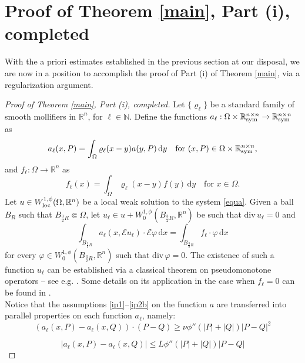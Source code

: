 \documentclass[leqno,11pt]{amsart}%
\numberwithin{equation}{section}
\newcommand{\dive}{\mathrm{div}\,}
\def\real{\mathbb R}
\def\R{\mathbb R}
\def\Rn{{\mathbb R}^{n}}
\def\rn{\Rn}
\def\d{\mathrm{d}}
\def\E{\mathcal{E}}
\def\dx{\d x}
\theoremstyle{definition}
\numberwithin{equation}{section}
\begin{document}
  \section{Proof of Theorem \ref{main}, Part (i), completed}\label{sec:proof2}
With the a priori estimates established in the previous section at our disposal, we are now in a position to accomplish the proof of Part (i) of Theorem \ref{main}, via a regularization argument.


\begin{proof}[Proof of Theorem \ref{main}, Part (i), completed]
Let $\{\varrho_\ell\}$ be a standard family of smooth mollifiers in $\rn$, for $\ell\in \mathbb N$. Define the  functions $a_\ell : \Omega\times \mathbb R^{n\times n}_{\rm sym} \to \mathbb R^{n\times n}_{\rm sym}$ as 
$${a}_\ell(x,P)=\int_{\Omega}\varrho_\ell(x-y)a(y,P)\,\d y \quad \text{for $(x,P)\in \Omega\times \mathbb R^{n\times n}_{\rm sym}$,}$$
and $f_\ell : \Omega \to \rn$ as
$${f}_\ell(x)=\int_{\Omega}\varrho_\ell(x-y)f(y)\,\d y \quad \text{for $x\in \Omega$.}$$
Let $u \in W^{1,\phi}_{\rm loc}(\Omega, \real^n)$ be a local weak solution to the system \eqref{equa}. Given a ball $B_R$ such that $B_{\frac 32R} \Subset \Omega$,  let $u_\ell \in u+ W^{1,\phi}_0(B_{\frac32 R}, \real^n)$ be such that $\dive u_\ell =0$ and
  \begin{equation}
    \label{equa-div-free-eps}
    \int_{B_{\frac{3}{2}R}}  a_\ell(x,\E u_\ell) \cdot \E\varphi \,\dx
    =
    \int_{B_{\frac{3}{2}R}} f_\ell\cdot\varphi\,\dx
  \end{equation}
  for every $\varphi\in W^{1,\phi}_0(B_{\frac{3}{2}R},\R^n)$ such that $\dive\varphi=0$.   The existence  of such a function $u_\ell$ can be established via a classical theorem  on pseudomonotone operators -- see e.g. \cite[Theorem 27.A]{zeidler}. Some details on its application in the case when $f_\ell=0$ can be found in \cite{DiKa}. 
	\\   Notice that the assumptions \eqref{ip1}--\eqref{ip2b} on the function $a$ are transferred into parallel properties on each function $a_\ell$, namely:
	   \begin{equation}\label{B1}
	( a_\ell(x,P)-a_\ell(x,Q))\cdot (P-Q) \ge \nu\phi''(|P|+|Q|)|P-Q|^2
\end{equation}
	   
	  \begin{equation}\label{B2}
	| a_\ell(x,P)-a_\ell(x,Q)|\le L \phi''(|P|+|Q|)|P-Q|
\end{equation}


\end{proof}
\end{document}

